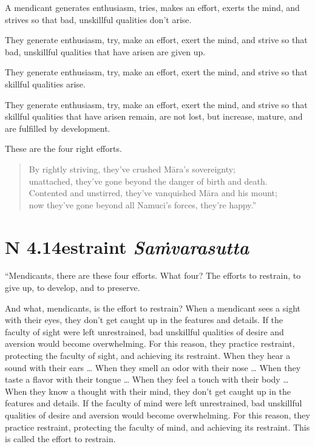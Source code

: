 \documentclass[12pt,openany]{book}%
\newcommand*{\suttatitleacronym}[1]{\smaller[2]{#1}\vspace*{.3em}}
\newcommand*{\suttatitletranslation}[1]{\linebreak{#1}}
\newcommand*{\suttatitleroot}[1]{\linebreak\smaller[2]\itshape{#1}}
\newcommand*{\tocacronym}[1]{\hspace*{-3.3em}{#1}\quad}
\newcommand*{\toctranslation}[1]{#1}
\newcommand*{\tocroot}[1]{(\textit{#1})}
\begin{document}
A mendicant generates enthusiasm, tries, makes an effort, exerts the mind, and strives so that bad, unskillful qualities don’t arise. 

They generate enthusiasm, try, make an effort, exert the mind, and strive so that bad, unskillful qualities that have arisen are given up. 

They generate enthusiasm, try, make an effort, exert the mind, and strive so that skillful qualities arise. 

They generate enthusiasm, try, make an effort, exert the mind, and strive so that skillful qualities that have arisen remain, are not lost, but increase, mature, and are fulfilled by development. 

These are the four right efforts. 

\begin{verse}%
By rightly striving, they’ve crushed \textsanskrit{Māra}’s sovereignty; \\
unattached, they’ve gone beyond the danger of birth and death. \\
Contented and unstirred, they’ve vanquished \textsanskrit{Māra} and his mount; \\
now they’ve gone beyond all Namuci’s forces, they’re happy.” 

%
\end{verse}

%
\section*{{\suttatitleacronym AN 4.14}{\suttatitletranslation Restraint }{\suttatitleroot Saṁvarasutta}}
\addcontentsline{toc}{section}{\tocacronym{AN 4.14} \toctranslation{Restraint } \tocroot{Saṁvarasutta}}

“Mendicants, there are these four efforts. What four? The efforts to restrain, to give up, to develop, and to preserve. 

And what, mendicants, is the effort to restrain? When a mendicant sees a sight with their eyes, they don’t get caught up in the features and details. If the faculty of sight were left unrestrained, bad unskillful qualities of desire and aversion would become overwhelming. For this reason, they practice restraint, protecting the faculty of sight, and achieving its restraint. When they hear a sound with their ears … When they smell an odor with their nose … When they taste a flavor with their tongue … When they feel a touch with their body … When they know a thought with their mind, they don’t get caught up in the features and details. If the faculty of mind were left unrestrained, bad unskillful qualities of desire and aversion would become overwhelming. For this reason, they practice restraint, protecting the faculty of mind, and achieving its restraint. This is called the effort to restrain. 
\end{document}
